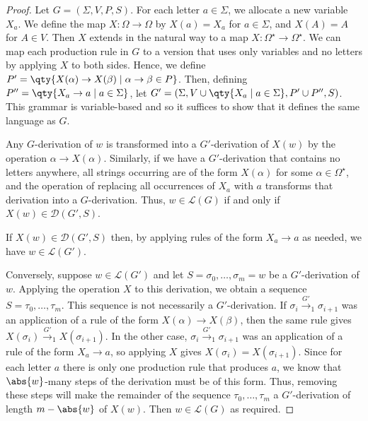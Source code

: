 \begin{proof}
	Let \( G = (\Sigma, V, P, S) \).
	For each letter \( a \in \Sigma \), we allocate a new variable \( X_a \).
	We define the map \( X \colon \Omega \to \Omega \) by \( X(a) = X_a \) for \( a \in \Sigma \), and \( X(A) = A \) for \( A \in V \).
	Then \( X \) extends in the natural way to a map \( X \colon \Omega^\star \to \Omega^\star \).
	We can map each production rule in \( G \) to a version that uses only variables and no letters by applying \( X \) to both sides.
	Hence, we define \( P' = \qty{X(\alpha) \to X(\beta) \mid \alpha \to \beta \in P} \).
	Then, defining \( P'' = \qty{X_a \to a \mid a \in \Sigma} \), let \( G' = (\Sigma, V \cup \qty{X_a \mid a \in \Sigma}, P' \cup P'', S) \).
	This grammar is variable-based and so it suffices to show that it defines the same language as \( G \).

	Any \( G \)-derivation of \( w \) is transformed into a \( G' \)-derivation of \( X(w) \) by the operation \( \alpha \to X(\alpha) \).
	Similarly, if we have a \( G' \)-derivation that contains no letters anywhere, all strings occurring are of the form \( X(\alpha) \) for some \( \alpha \in \Omega^\star \), and the operation of replacing all occurrences of \( X_a \) with \( a \) transforms that derivation into a \( G \)-derivation.
	Thus, \( w \in \mathcal L(G) \) if and only if \( X(w) \in \mathcal D(G', S) \).

	If \( X(w) \in \mathcal D(G', S) \) then, by applying rules of the form \( X_a \to a \) as needed, we have \( w \in \mathcal L(G') \).

	Conversely, suppose \( w \in \mathcal L(G') \) and let \( S = \sigma_0, \dots, \sigma_m = w \) be a \( G' \)-derivation of \( w \).
	Applying the operation \( X \) to this derivation, we obtain a sequence \( S = \tau_0, \dots, \tau_m \).
	This sequence is not necessarily a \( G' \)-derivation.
	If \( \sigma_i \xrightarrow {G'}_1 \sigma_{i+1} \) was an application of a rule of the form \( X(\alpha) \to X(\beta) \), then the same rule gives \( X(\sigma_i) \xrightarrow {G'}_1 X(\sigma_{i+1}) \).
	In the other case, \( \sigma_i \xrightarrow {G'}_1 \sigma_{i+1} \) was an application of a rule of the form \( X_a \to a \), so applying \( X \) gives \( X(\sigma_i) = X(\sigma_{i+1}) \).
	Since for each letter \( a \) there is only one production rule that produces \( a \), we know that \( \abs{w} \)-many steps of the derivation must be of this form.
	Thus, removing these steps will make the remainder of the sequence \( \tau_0, \dots, \tau_m \) a \( G' \)-derivation of length \( m - \abs{w} \) of \( X(w) \).
	Then \( w \in \mathcal L(G) \) as required.
\end{proof}
